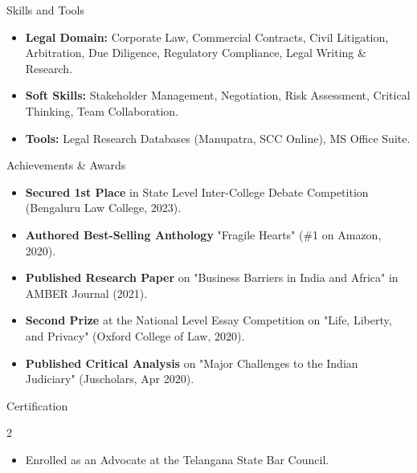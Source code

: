 \documentclass{resume} %
\begin{document}

\begin{rSection}{Skills and Tools}

\begin{itemize}[left=-1.5em, labelsep=.1cm, labelwidth=.2cm, itemsep=0.0em]
    \item \textbf{Legal Domain:} Corporate Law, Commercial Contracts, Civil Litigation, Arbitration, Due Diligence, Regulatory Compliance, Legal Writing \& Research.
    \item \textbf{Soft Skills:} Stakeholder Management, Negotiation, Risk Assessment, Critical Thinking, Team Collaboration.
    \item \textbf{Tools:} Legal Research Databases (Manupatra, SCC Online), MS Office Suite.
\end{itemize}

\end{rSection}


\vspace{0.5em}
\begin{rSection}{Achievements \& Awards}
\begin{itemize}[left=-1.5em, labelsep=.1cm, labelwidth=.2cm, itemsep=0.0em]
\item \textbf{Secured 1st Place} in State Level Inter-College Debate Competition (Bengaluru Law College, 2023).
\item \textbf{Authored Best-Selling Anthology} "Fragile Hearts" (\#1 on Amazon, 2020).
\item \textbf{Published Research Paper} on "Business Barriers in India and Africa" in AMBER Journal (2021).
\item \textbf{Second Prize} at the National Level Essay Competition on "Life, Liberty, and Privacy" (Oxford College of Law, 2020).
\item \textbf{Published Critical Analysis} on "Major Challenges to the Indian Judiciary" (Juscholars, Apr 2020).
\end{itemize}
\end{rSection}
\vspace{0.5 em}

\begin{rSection}{Certification}
\setlength{\columnsep}{2em}
\begin{multicols}{2}
\begin{itemize}[left=-1.5em, labelwidth=.1cm, itemsep=0.0em]
\item Enrolled as an Advocate at the Telangana State Bar Council.
\end{itemize}
\end{multicols}
\end{rSection}
\vspace{0.5 em}
\end{document}
